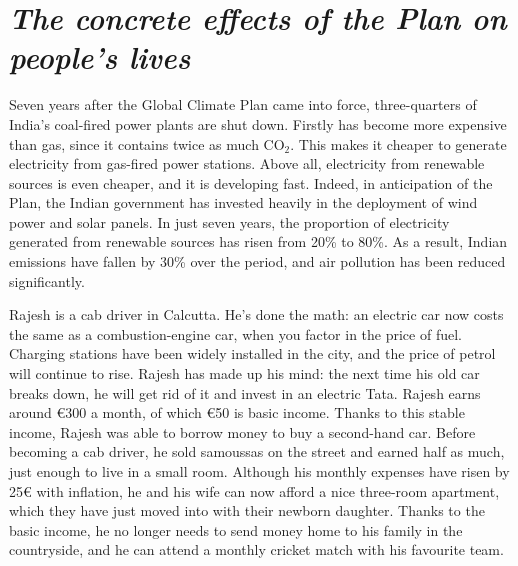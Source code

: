 \documentclass[a5paper,english,openany]{memoir}
\begin{document}
\chapter*{\textit{The concrete effects of the Plan on people's lives}}\label{ch:narr_bilan}

Seven years after the Global Climate Plan came into force, three-quarters of India's coal-fired power plants are shut down. %
Firstly %
has become %
 more expensive than gas, since it contains twice as much CO$_\text{2}$. This makes it cheaper to generate electricity from gas-fired power stations. Above all, electricity from renewable sources is even cheaper, and it is developing fast. Indeed, in anticipation of the Plan, the Indian government has invested heavily in the deployment of wind power and solar panels. In just seven years, the proportion of electricity generated from renewable sources has risen from 20\% to 80\%. As a result, Indian emissions have fallen by 30\% over the period, and air pollution has been reduced significantly. %

Rajesh is a cab driver in Calcutta. He's done the math: an electric car now costs the same as a combustion-engine car, when you factor in the price of fuel. Charging stations have been widely installed in the city, and the price of petrol will continue to rise. Rajesh has made up his mind: the next time his old car breaks down, he will get rid of it and invest in an electric Tata. Rajesh earns around \euro{}300 a month, of which \euro{}50 is basic income. Thanks to this stable income, Rajesh was able to borrow money to buy a second-hand car. %
Before becoming a cab driver, he sold samoussas on the street and earned half as much, just enough to live in a small room. Although his monthly expenses have risen by 25\euro{} with inflation, he and his wife can now afford a nice three-room apartment, which they have just moved into with their newborn daughter. Thanks to the basic income, he no longer needs to send money home to his family in the countryside, and he can attend a monthly cricket match with his favourite team. 
\end{document}
